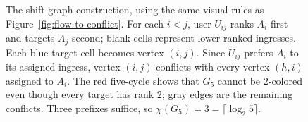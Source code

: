\documentclass[10pt,a4paper]{article}
\begin{document}
\begin{figure}[tbp]
{%
}
\caption{The shift-graph construction, using the same visual rules as Figure~\ref{fig:flow-to-conflict}.
For each $i<j$, user $U_{ij}$ ranks $A_i$ first and targets $A_j$ second; blank cells represent lower-ranked ingresses.
Each blue target cell becomes vertex $(i,j)$. Since $U_{ij}$ prefers $A_i$ to its assigned ingress, vertex $(i,j)$ conflicts with every vertex $(h,i)$ assigned to $A_i$.
The red five-cycle shows that $G_5$ cannot be $2$-colored even though every target has rank $2$; gray edges are the remaining conflicts. Three prefixes suffice, so $\chi(G_5)=3=\lceil\log_2 5\rceil$.}
\label{fig:shift}
\end{figure}
\end{document}
